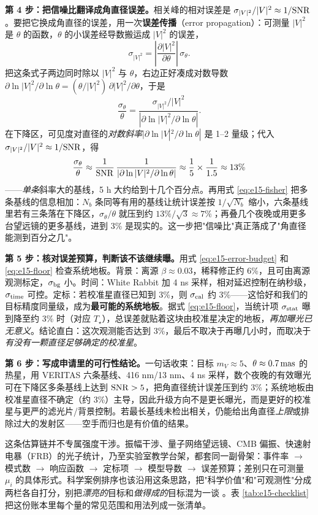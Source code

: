 \textbf{第 4 步：把信噪比翻译成角直径误差。}相关峰的相对误差是 \(\sigma_{|V|^2}/|V|^2\approx1/{\rm SNR}\)。要把它换成角直径的误差，用一次\textbf{误差传播}（error propagation）：可测量 \(|V|^2\) 是 \(\theta\) 的函数，\(\theta\) 的小误差经导数搬运成 \(|V|^2\) 的误差，
\[
  \sigma_{|V|^2}=\left|\frac{\partial|V|^2}{\partial\theta}\right|\,\sigma_\theta .
\]
把这条式子两边同时除以 \(|V|^2\) 与 \(\theta\)，右边正好凑成对数导数 \(\partial\ln|V|^2/\partial\ln\theta=(\theta/|V|^2)\,\partial|V|^2/\partial\theta\)，于是
\[
  \frac{\sigma_\theta}{\theta}
  =\frac{\sigma_{|V|^2}/|V|^2}{\left|\partial\ln|V|^2/\partial\ln\theta\right|} .
\]
在下降区，可见度对直径的\emph{对数斜率}\(|\partial\ln|V|^2/\partial\ln\theta|\) 是 1--2 量级；代入 \(\sigma_{|V|^2}/|V|^2\approx1/{\rm SNR}\)，得
\[
  \frac{\sigma_\theta}{\theta}
  \approx\frac{1}{{\rm SNR}}\,
  \frac{1}{\left|\partial\ln|V|^2/\partial\ln\theta\right|}
  \approx\frac{1}{5}\times\frac{1}{1.5}
  \approx13\%
\]
——\emph{单条}斜率大的基线，5 h 大约给到十几个百分点。再用式 \eqref{eq:e15-fisher} 把多条基线的信息相加：\(N_b\) 条同等有用的基线让统计误差按 \(1/\sqrt{N_b}\) 缩小，六条基线里若有三条落在下降区，\(\sigma_\theta/\theta\) 就压到约 \(13\%/\sqrt3\approx7\%\)；再叠几个夜晚或用更多台望远镜的更多基线，进到 3\% 是现实的。这一步把"信噪比"真正落成了"角直径能测到百分之几"。

\textbf{第 5 步：核对误差预算，判断该不该继续曝。}用式 \eqref{eq:e15-error-budget} 和 \eqref{eq:e15-floor} 检查系统地板。背景：离源 \(\beta\approx0.03\)，稀释修正约 6\%，且可由离源观测标定，\(\sigma_{\rm bg}\) 小。时间：White Rabbit 加 4 ns 采样，相对延迟控制在纳秒级，\(\sigma_{\rm time}\) 可控。定标：若校准星直径已知到 3\%，则 \(\sigma_{\rm cal}\) 约 3\%——这恰好和我们的目标精度同量级，成为\textbf{最可能的系统地板}。据式 \eqref{eq:e15-floor}，当统计项 \(\sigma_{\rm stat}\) 曝到降至约 3\% 时（对应 \(T_\star\)），总误差就贴着这块由校准星决定的地板，\emph{再加曝光已无意义}。结论直白：这次观测能否达到 3\%，最后不取决于再曝几小时，而取决于\emph{有没有一颗直径足够确定的校准星}。

\textbf{第 6 步：写成申请里的可行性结论。}一句话收束：目标 \(m_V\approx5\)、\(\theta\approx0.7\,{\rm mas}\) 的热星，用 VERITAS 六条基线、416 nm/13 nm、4 ns 采样，数个夜晚的有效曝光可在下降区多条基线上达到 \({\rm SNR}>5\)，把角直径统计误差压到约 3\%；系统地板由校准星直径不确定（约 3\%）主导，因此升级方向不是更长曝光，而是更好的校准星与更严的滤光片/背景控制。若最长基线未检出相关，仍能给出角直径\emph{上限}或排除过大的发射区——空手而归也是有价值的结果。

这条估算链并不专属强度干涉。振幅干涉、量子网络望远镜、CMB 偏振、快速射电暴（FRB）的光子统计，乃至实验室教学台架，都套同一副骨架：事件率 \(\to\) 模式数 \(\to\) 响应函数 \(\to\) 定标项 \(\to\) 模型导数 \(\to\) 误差预算；差别只在可测量 \(\mu_i\) 的具体形式。科学案例排序也该沿用这条思路，把"科学价值"和"可观测性"分成两栏各自打分，别把\emph{漂亮的}目标和\emph{做得成的}目标混为一谈 \citep{2010SPIE.7734E..0AD,2012MNRAS.419..172N,2013APh....43..331D,2022SPIE12183E..0DK}。表 \ref{tab:e15-checklist} 把这份账本里每个量的常见范围和用法列成一张清单。


